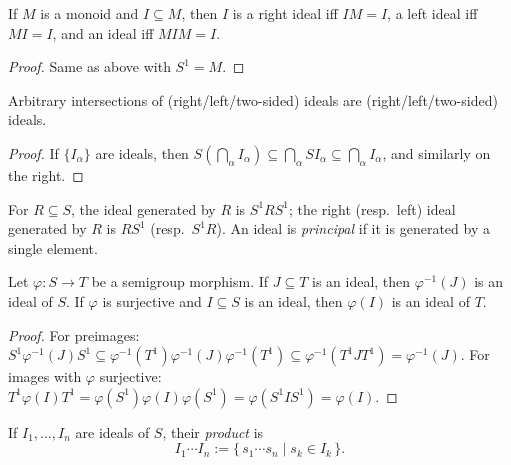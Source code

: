 \begin{lemma}
\label{lem:ideal-characterization-monoid}
If \(M\) is a monoid and \(I\subseteq M\), then \(I\) is a right ideal iff \(IM=I\), a left ideal iff \(MI=I\), and an ideal iff \(MIM=I\).
\end{lemma}
\begin{proof}
Same as above with \(S^1=M\).
\end{proof}

\begin{lemma}[Intersections]
\label{lem:intersection-of-ideals}
Arbitrary intersections of (right/left/two-sided) ideals are (right/left/two-sided) ideals.
\end{lemma}
\begin{proof}
If \(\{I_\alpha\}\) are ideals, then \(S(\bigcap_\alpha I_\alpha)\subseteq \bigcap_\alpha S I_\alpha\subseteq \bigcap_\alpha I_\alpha\), and similarly on the right.
\end{proof}

\begin{definition}
\label{def:generated-ideal}
For \(R\subseteq S\), the ideal generated by \(R\) is \(S^1 R S^1\); the right (resp.\ left) ideal generated by \(R\) is \(R S^1\) (resp.\ \(S^1 R\)). An ideal is \emph{principal} if it is generated by a single element.
\end{definition}

\begin{lemma}
\label{lem:ideals-stable-under-morphisms}
Let \(\varphi:S\to T\) be a semigroup morphism. If \(J\subseteq T\) is an ideal, then \(\varphi^{-1}(J)\) is an ideal of \(S\). If \(\varphi\) is surjective and \(I\subseteq S\) is an ideal, then \(\varphi(I)\) is an ideal of \(T\).
\end{lemma}
\begin{proof}
For preimages: \(S^1\varphi^{-1}(J)S^1\subseteq \varphi^{-1}(T^1)\varphi^{-1}(J)\varphi^{-1}(T^1)\subseteq \varphi^{-1}(T^1JT^1)=\varphi^{-1}(J)\). For images with \(\varphi\) surjective: \(T^1\varphi(I)T^1=\varphi(S^1)\varphi(I)\varphi(S^1)=\varphi(S^1 I S^1)=\varphi(I)\).
\end{proof}

\begin{definition}
\label{def:product-of-ideals}
If \(I_1,\dots,I_n\) are ideals of \(S\), their \emph{product} is
\[
I_1\cdots I_n:=\{\,s_1\cdots s_n \mid s_k\in I_k\,\}.
\]
\end{definition}

